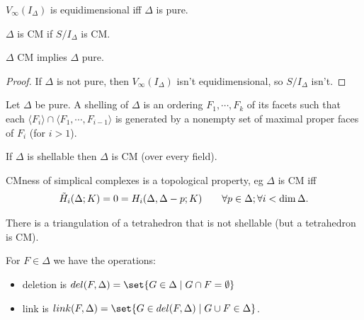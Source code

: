 \begin{lemma}
    $V_\infty (I_\Delta)$ is equidimensional iff $\Delta$ is pure.
\end{lemma}

\begin{definition}
    $\Delta$ is CM if $S / I_\Delta $ is CM.
\end{definition}

\begin{lemma}
    $\Delta$ CM implies $\Delta$ pure.
\end{lemma}

\begin{proof}
    If $\Delta$ is not pure, then $V_\infty (I_\Delta) $ isn't equidimensional, so $S/ I_\Delta$ isn't.
\end{proof}

\begin{definition}
    Let $\Delta$ be pure. A shelling of $\Delta$ is an ordering $F_1 , \cdots, F_k$ of its facets such that each $\langle F_i \rangle \cap \langle F_1 , \cdots , F_{i-1}\rangle$ is generated by a nonempty set of maximal proper faces of $F_i$ (for $i > 1$).
\end{definition}

\begin{theorem}
    If $\Delta$ is shellable then $\Delta $ is CM (over every field).
\end{theorem}

\begin{theorem}
    CMness of simplical complexes is a topological property, eg $\Delta$ is CM iff
    \begin{align*}
        \Tilde{H}_i( \Delta ; K ) = 0 = H_i (\Delta, \Delta - p ; K) \qquad \forall p \in \Delta; \forall  i < \dim \Delta.
    \end{align*}
\end{theorem}

\begin{theorem}
    There is a triangulation of a tetrahedron that is not shellable (but a tetrahedron is CM).
\end{theorem}

\begin{definition}
    For $F \in \Delta$ we have the operations:
    \begin{itemize}
        \item deletion is $del(F,\Delta) = \set{ G \in \Delta \mid G \cap F = \emptyset}$
        \item link is $link(F,\Delta) = \set{G \in del(F, \Delta) \mid G \cup F \in \Delta}$.
    \end{itemize}
\end{definition}


